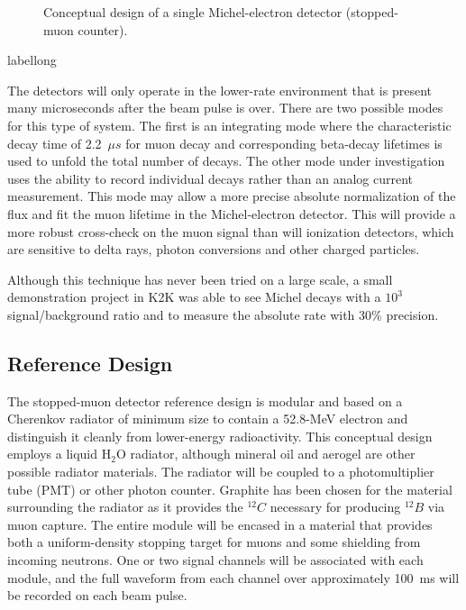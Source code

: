 \begin{figure}[htbp]
\begin{center}
\caption[Michel-electron detector conceptualization]{Conceptual design of a single Michel-electron detector (stopped-muon counter). 
}
\label{fig:MichelDecayOptions}
\end{center}
\end{figure}
\begin{cdrfigure}[short]{label}{long}
\end{cdrfigure}

The detectors will only operate in the lower-rate
environment that is present many microseconds after the beam pulse is
over. There are two possible modes for this type of system. 
The first is an integrating mode where the characteristic decay time of 
2.2~$\mu s$ for muon decay and corresponding beta-decay lifetimes is used to
unfold the total number of decays. The other mode under
investigation uses the ability to record individual decays rather
than an analog current measurement. This mode may allow a more precise absolute
normalization of the flux and fit the muon lifetime in the Michel-electron detector. 
This will provide a more robust cross-check on the
muon signal than will ionization detectors, which are sensitive to delta
rays, photon conversions and other charged particles.

Although this technique has never been tried on a large scale, a small
demonstration project in K2K was able to see Michel decays with a
$10^{3}$ signal/background ratio and to measure the absolute rate with
30\% precision\cite{ref:K2KMuDecayMon}.

\subsection{Reference Design}

The stopped-muon detector reference design
is modular and based on a Cherenkov radiator of
minimum size to contain a 52.8-MeV electron and distinguish it cleanly
from lower-energy radioactivity. This conceptual design employs
a liquid H$_2$O radiator, although mineral oil and aerogel are other
possible radiator materials. The radiator will be coupled to a photomultiplier tube (PMT) or
other photon counter. Graphite has been chosen for the material
surrounding the radiator as it provides the $^{12}C$ necessary for
producing $^{12}B$ via muon capture. The entire module will be
encased in a material that provides both a uniform-density stopping
target for muons and some shielding from incoming neutrons. One or two
signal channels will be associated with each module, and the full
waveform from each channel over approximately 100~ms will be recorded
on each beam pulse.

